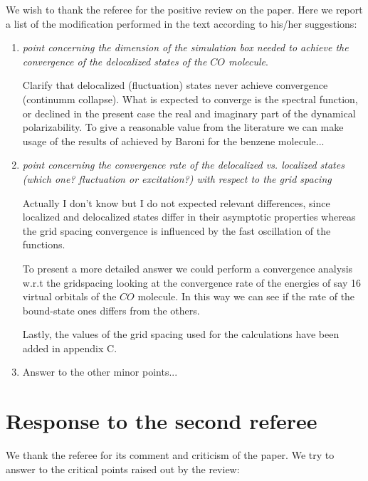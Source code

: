 \documentclass[11pt,a4paper]{article}
\begin{document}
We wish to thank the referee for the positive review on the paper. Here we report a list of the modification performed in the text according
to his/her suggestions:
\begin{enumerate}
  \item \emph{point concerning the dimension of the simulation box needed to achieve the convergence of the delocalized states of the $CO$ molecule}. 
  
  Clarify that delocalized (fluctuation) states never achieve convergence (continumm collapse). What is expected to converge is the spectral function, or declined in the present case the real and imaginary part of the dynamical polarizability. To give a reasonable value from the literature we can make usage of the results of achieved by Baroni for the benzene molecule... 
  \item \emph{point concerning the convergence rate of the delocalized vs. localized states (which one? fluctuation or excitation?) with respect
  to the grid spacing}
  
 Actually I don't know but I do not expected relevant differences, since localized and delocalized states differ in their asymptotic properties whereas the grid spacing convergence is influenced by the fast oscillation of the functions.  
 
 To present a more detailed answer we could perform a convergence analysis w.r.t the gridspacing looking at the convergence rate of the energies of say 16 virtual orbitals of the $CO$ molecule. In this way we can see if the rate of the bound-state ones differs from the others.
 
 Lastly, the values of the grid spacing used for the calculations have been added in appendix C.
 
\item Answer to the other minor points...
  
\end{enumerate}

\section*{Response to the second referee}

We thank the referee for its comment and criticism of the paper.
We try to answer to the critical points raised out by the review:
\end{document}
